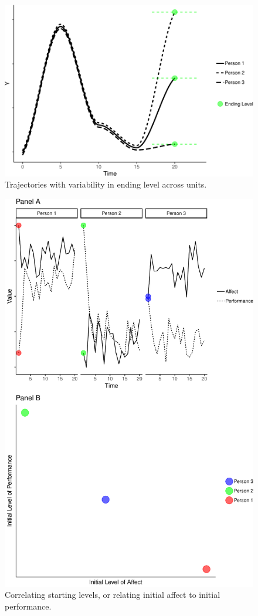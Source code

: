 \documentclass[english,,man]{apa6}
\theoremstyle{definition}
\theoremstyle{definition}
\theoremstyle{definition}
\theoremstyle{remark}
\begin{document}
\begin{figure}
\centering
\includegraphics{figures/unnamed-chunk-9-1.pdf}
\caption{\label{fig:unnamed-chunk-9}Trajectories with variability in ending
level across units.\label{level_var}}
\end{figure}

\begin{figure}
\centering
\includegraphics{figures/unnamed-chunk-10-1.pdf}
\caption{\label{fig:unnamed-chunk-10}Correlating starting levels, or
relating initial affect to initial performance.\label{level_correlate}}
\end{figure}
\end{document}
